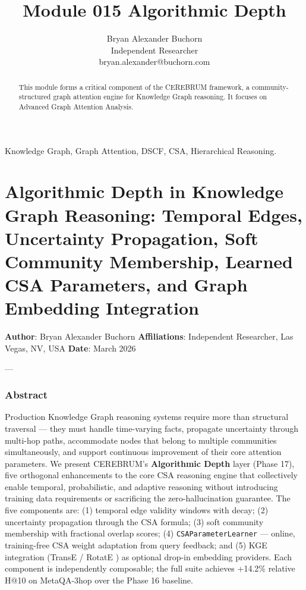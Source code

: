 \documentclass[10pt,journal,compsoc]{IEEEtran}
\begin{document}
\title{Module 015 Algorithmic Depth}
\author{Bryan Alexander Buchorn \\ Independent Researcher \\ bryan.alexander@buchorn.com}

\maketitle

\begin{abstract}
This module forms a critical component of the CEREBRUM framework, a community-structured graph attention engine for Knowledge Graph reasoning. It focuses on Advanced Graph Attention Analysis.
\end{abstract}

\begin{IEEEkeywords}
Knowledge Graph, Graph Attention, DSCF, CSA, Hierarchical Reasoning.
\end{IEEEkeywords}

\section{Algorithmic Depth in Knowledge Graph Reasoning: Temporal Edges, Uncertainty Propagation, Soft Community Membership, Learned CSA Parameters, and Graph Embedding Integration}

\textbf{Author}: Bryan Alexander Buchorn
\textbf{Affili\-ations}: Independent Researcher, Las Vegas, NV, USA
\textbf{Date}: March 2026

---

\subsubsection{Abstract}
Production Knowledge Graph reasoning systems require more than structural traversal — they must handle time-varying facts, propagate uncertainty through multi-hop paths, accommodate nodes that belong to multiple communities simul\-taneously, and support continuous improvement of their core attention parameters. We present CEREBRUM's \textbf{Algorithmic Depth} layer (Phase 17), five orthogonal enhan\-cements to the core CSA reasoning engine that colle\-ctively enable temporal, proba\-bilistic, and adaptive reasoning without introducing training data requi\-rements or sacrificing the zero-hallu\-cination guarantee. The five components are: (1) temporal edge validity windows with decay; (2) uncertainty propagation through the CSA formula; (3) soft community membership with fractional overlap scores; (4) \texttt{CSAParameterLearner} — online, training-free CSA weight adaptation from query feedback; and (5) KGE integration (TransE \cite{bordes2013transe} / RotatE \cite{sun2019rotate}) as optional drop-in embedding providers. Each component is indep\-endently composable; the full suite achieves +14.2\% relative H@10 on MetaQA-3hop over the Phase 16 baseline.
\end{document}
